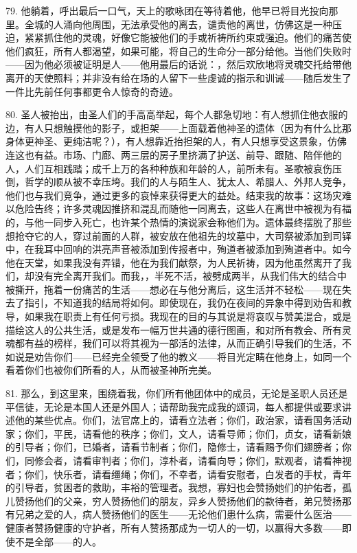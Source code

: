 79. 他躺着，呼出最后一口气，天上的歌咏团在等待着他，他早已将目光投向那里。全城的人涌向他周围，无法承受他的离去，谴责他的离世，仿佛这是一种压迫，紧紧抓住他的灵魂，好像它能被他们的手或祈祷所约束或强迫。他们的痛苦使他们疯狂，所有人都渴望，如果可能，将自己的生命分一部分给他。当他们失败时——因为他必须被证明是人——他用最后的话说：，然后欢欣地将灵魂交托给带他离开的天使照料；并非没有给在场的人留下一些虔诚的指示和训诫——随后发生了一件比先前任何事都更令人惊奇的奇迹。\par

80. 圣人被抬出，由圣人们的手高高举起，每个人都急切地：有人想抓住他衣服的边，有人只想触摸他的影子，或担架——上面载着他神圣的遗体（因为有什么比那身体更神圣、更纯洁呢？），有人想靠近抬担架的人，有人只想享受这景象，仿佛连这也有益。市场、门廊、两三层的房子里挤满了护送、前导、跟随、陪伴他的人，人们互相践踏；成千上万的各种种族和年龄的人，前所未有。圣歌被哀伤压倒，哲学的顺从被不幸压垮。我们的人与陌生人、犹太人、希腊人、外邦人竞争，他们也与我们竞争，通过更多的哀悼来获得更大的益处。结束我的故事：这场灾难以危险告终；许多灵魂因推挤和混乱而随他一同离去，这些人在离世中被视为有福的，与他一同步入死亡，也许某个热情的演说家会称他们为。遗体最终摆脱了那些想抢夺它的人，穿过前面的人群，被安放在他祖先的坟墓中，大司祭被添加到司铎中，在我耳中回响的洪亮声音被添加到传报者中，殉道者被添加到殉道者中。如今他在天堂，如果我没有弄错，他在为我们献祭，为人民祈祷，因为他虽然离开了我们，却没有完全离开我们。而我，，半死不活，被劈成两半，从我们伟大的结合中被撕开，拖着一份痛苦的生活——想必在与他分离后，这生活并不轻松——现在失去了指引，不知道我的结局将如何。即使现在，我仍在夜间的异象中得到劝告和教导，如果我在职责上有任何亏损。我现在的目的与其说是将哀叹与赞美混合，或是描绘这人的公共生活，或是发布一幅万世共通的德行图画，和对所有教会、所有灵魂都有益的榜样，我们可以将其视为一部活的法律，从而正确引导我们的生活，不如说是劝告你们——已经完全领受了他的教义——将目光定睛在他身上，如同一个看着你们也被你们所看的人，从而被圣神所完美。\par

81. 那么，到这里来，围绕着我，你们所有他团体中的成员，无论是圣职人员还是平信徒，无论是本国人还是外国人；请帮助我完成我的颂词，每人都提供或要求讲述他的某些优点。你们，法官席上的，请看立法者；你们，政治家，请看国务活动家；你们，平民，请看他的秩序；你们，文人，请看导师；你们，贞女，请看新娘的引导者；你们，已婚者，请看节制者；你们，隐修士，请看赐予你们翅膀者；你们，同修会者，请看审判者；你们，淳朴者，请看向导；你们，默观者，请看神视者；你们，快乐者，请看缰绳；你们，不幸者，请看安慰者，白发者的手杖，青年的引导者，贫困者的救助，丰裕的管理者。我想，寡妇也会赞扬她们的护佑者，孤儿赞扬他们的父亲，穷人赞扬他们的朋友，异乡人赞扬他们的款待者，弟兄赞扬那有兄弟之爱的人，病人赞扬他们的医生——无论他们患什么病，需要什么医治——健康者赞扬健康的守护者，所有人赞扬那成为一切人的一切，以赢得大多数——即使不是全部——的人。\par

